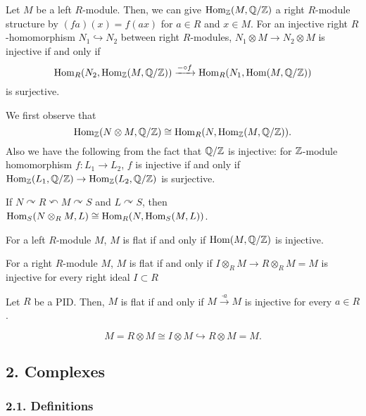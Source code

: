 \documentclass{../../small}
\begin{document}
\begin{prop*}[1.8.3]
Let $M$ be a left $R$-module.
Then, we can give $\operatorname{Hom}_{\mathbb{Z}}(M,\mathbb{Q}/\mathbb{Z})$ a right $R$-module structure by $(fa)(x)=f(ax)$ for $a\in R$ and $x\in M$.
For an injective right $R$-homomorphism $N_1\hookrightarrow N_2$ between right $R$-modules, $N_1\otimes M\to N_2\otimes M$ is injective if and only if
\[\operatorname{Hom}_R(N_2,\operatorname{Hom}_{\mathbb{Z}}(M,\mathbb{Q}/\mathbb{Z}))\xrightarrow{-\circ f}\operatorname{Hom}_R(N_1,\operatorname{Hom}(M,\mathbb{Q}/\mathbb{Z}))\]
is surjective.
\end{prop*}
\begin{pf}
We first observe that
\[\operatorname{Hom}_{\mathbb{Z}}(N\otimes M,\mathbb{Q}/\mathbb{Z})\cong\operatorname{Hom}_R(N,\operatorname{Hom}_{\mathbb{Z}}(M,\mathbb{Q}/\mathbb{Z})).\]
Also we have the following from the fact that $\mathbb{Q}/\mathbb{Z}$ is injective: for $\mathbb{Z}$-module homomorphism $f:L_1\to L_2$, $f$ is injective if and only if $\operatorname{Hom}_{\mathbb{Z}}(L_1,\mathbb{Q}/\mathbb{Z})\to\operatorname{Hom}_{\mathbb{Z}}(L_2,\mathbb{Q}/\mathbb{Z})$ is surjective.
\end{pf}
\begin{rmk*}
If $N\curvearrowright R\curvearrowleft M\curvearrowright S$ and $L\curvearrowright S$, then $\operatorname{Hom}_S(N\otimes_RM,L)\cong\operatorname{Hom}_R(N,\operatorname{Hom}_S(M,L))$.
\end{rmk*}

\begin{cor*}[1.8.4]
For a left $R$-module $M$, $M$ is flat if and only if $\operatorname{Hom}(M,\mathbb{Q}/\mathbb{Z})$ is injective.
\end{cor*}

\begin{cor*}[1.8.5]
For a right $R$-module $M$, $M$ is flat if and only if $I\otimes_RM\to R\otimes_RM=M$ is injective for every right ideal $I\subset R$
\end{cor*}

\begin{cor*}[1.8.6]
Let $R$ be a PID.
Then, $M$ is flat if and only if $M\xrightarrow{\cdot a}M$ is injective for every $a\in R$.
\end{cor*}
\begin{pf}
\[M=R\otimes M\cong I\otimes M\hookrightarrow R\otimes M=M.\]
\end{pf}


\subsection*{2. Complexes}

\subsubsection*{2.1. Definitions}
\end{document}
